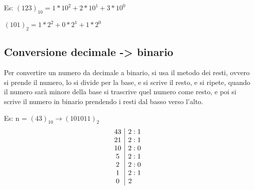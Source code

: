 \documentclass[a4paper,12pt]{article}
\begin{document}
	Es: $(123)_{10} = 1*10^2 + 2*10^1 + 3*10^0$
	
	$(101)_2 = 1*2^2+0*2^1+1*2^0$
	
	\subsection{Conversione decimale -> binario}
	Per convertire un numero da decimale a binario, si usa il metodo dei resti, ovvero si prende il numero, lo si divide per la base, e si scrive il resto, e si ripete, quando il numero sarà minore della base si trascrive quel numero come resto, e poi si scrive il numero in binario prendendo i resti dal basso verso l'alto.
	
	Es: n = $(43)_{10} \rightarrow (101011)_2$
	\[
	\begin{array}{c | c}
		43 & 2 : 1\\
		21 & 2 : 1\\
		10 & 2 : 0\\
		5 & 2 : 1\\
		2 & 2 : 0\\
		1 & 2 : 1\\
		0 & 2 \; \; \; \; \, \\
	\end{array}
	\]
		
\end{document}
